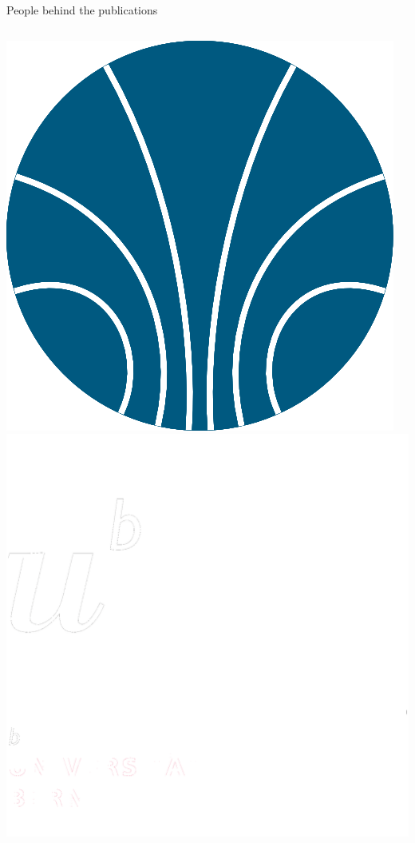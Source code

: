 \documentclass[10pt,aspectratio=169]{beamer}
\begin{document}
\begin{frame}{People behind the publications}
\begin{columns}
\begin{center}
        \includegraphics[height=\myHeight\textheight]{logos/kip.png}
        \includegraphics[height=\myHeight\textheight]{logos/logo_bern.png}

\end{center}
\end{columns}
\end{frame}
\end{document}
